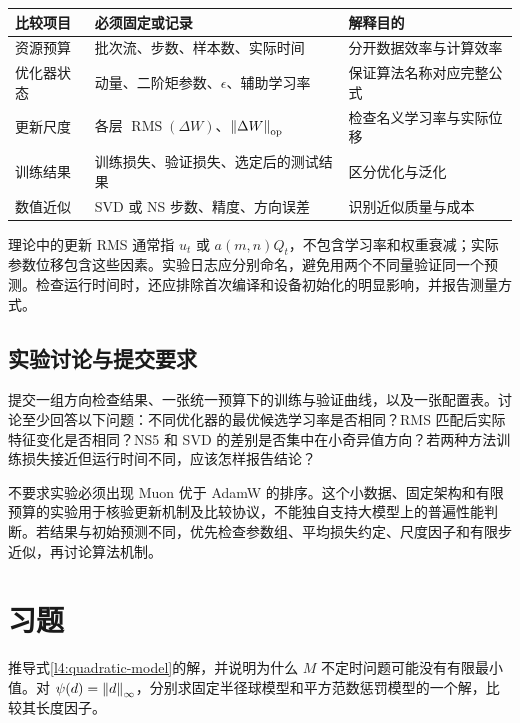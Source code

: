 \begin{center}
\small
\begin{tabularx}{\textwidth}{lXX}
\toprule
比较项目 & 必须固定或记录 & 解释目的\\
\midrule
资源预算 & 批次流、步数、样本数、实际时间 & 分开数据效率与计算效率\\
优化器状态 & 动量、二阶矩参数、$\epsilon$、辅助学习率 & 保证算法名称对应完整公式\\
更新尺度 & 各层 $\operatorname{RMS}(\Delta W)$、$\left\lVert\Delta W\right\rVert_{\rm op}$ & 检查名义学习率与实际位移\\
训练结果 & 训练损失、验证损失、选定后的测试结果 & 区分优化与泛化\\
数值近似 & SVD 或 NS 步数、精度、方向误差 & 识别近似质量与成本\\
\bottomrule
\end{tabularx}
\end{center}

理论中的更新 RMS 通常指 $u_t$ 或 $a(m,n)Q_t$，不包含学习率和权重衰减；实际参数位移包含这些因素。实验日志应分别命名，避免用两个不同量验证同一个预测。检查运行时间时，还应排除首次编译和设备初始化的明显影响，并报告测量方式。

\subsection{实验讨论与提交要求}

提交一组方向检查结果、一张统一预算下的训练与验证曲线，以及一张配置表。讨论至少回答以下问题：不同优化器的最优候选学习率是否相同？RMS 匹配后实际特征变化是否相同？NS5 和 SVD 的差别是否集中在小奇异值方向？若两种方法训练损失接近但运行时间不同，应该怎样报告结论？

不要求实验必须出现 Muon 优于 AdamW 的排序。这个小数据、固定架构和有限预算的实验用于核验更新机制及比较协议，不能独自支持大模型上的普遍性能判断。若结果与初始预测不同，优先检查参数组、平均损失约定、尺度因子和有限步近似，再讨论算法机制。

\section{习题}
\label{l4:exercises}

\begin{exercise}[二次度量与范数球]
\label{l4:ex-metric}
推导式\eqref{l4:quadratic-model}的解，并说明为什么 $M$ 不定时问题可能没有有限最小值。对 $\psi(d)=\left\lVert d\right\rVert_\infty$，分别求固定半径球模型和平方范数惩罚模型的一个解，比较其长度因子。
\end{exercise}

